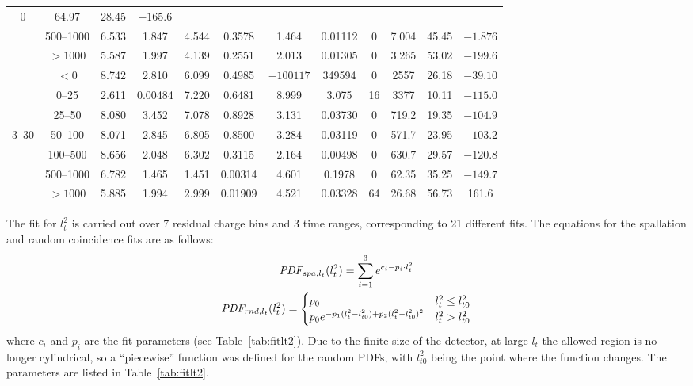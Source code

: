 \begin{table*}[hbt]
\begin{tabular}{cc|cccccc|cccc}
      0  & 64.97 & 28.45 &$-165.6$   \\
      & 500--1000& 6.533 & 1.847 & 4.544 & 0.3578  & 1.464 & 0.01112 &
      0  & 7.004 & 45.45 &  $-1.876$ \\
      & $>1000$ & 5.587 & 1.997 & 4.139 & 0.2551  & 2.013 & 0.01305 &
      0  & 3.265 & 53.02 &$-199.6$   \\
\hline
      & $<0$    & 8.742 & 2.810 & 6.099 & 0.4985  &$-100117$ & 349594  &
      0  & 2557  & 26.18 & $-39.10$  \\
      & 0--25    & 2.611 &0.00484& 7.220 & 0.6481  & 8.999 & 3.075   &
      16 & 3377  & 10.11 & $-115.0$   \\
      & 25--50   & 8.080 & 3.452 & 7.078 & 0.8928  & 3.131 & 0.03730 &
      0  & 719.2 & 19.35 &$-104.9$   \\
3--30  & 50--100  & 8.071 & 2.845 & 6.805 & 0.8500  & 3.284 & 0.03119 &
      0  & 571.7 & 23.95 &$-103.2$   \\
      & 100--500 & 8.656 & 2.048 & 6.302 & 0.3115  & 2.164 & 0.00498 &
      0  & 630.7 & 29.57 & $-120.8$   \\
      & 500--1000& 6.782 & 1.465 & 1.451 & 0.00314 & 4.601 & 0.1978  &
      0  & 62.35 & 35.25 & $-149.7$   \\
      & $>1000$ & 5.885 & 1.994 & 2.999 & 0.01909 & 4.521 & 0.03328 &
      64 & 26.68 & 56.73 & 161.6   \\
\bottomrule        %
\end{tabular}
\label{tab:fitlt2}
\end{table*}


The fit for $l_t^2$ is carried out over 7 residual charge bins and 3 time ranges, corresponding to 21 different fits. The equations for the spallation and random coincidence fits are as follows:
\begin{gather}
    \mbox{\it PDF}_{spa,l_t}(l_t^2) = \sum_{i=1}^3e^{c_i - p_i\cdot l_t^2}\\
    \mbox{\it PDF}_{rnd,l_t}(l_t^2) = 
    \begin{cases}
       p_0 & l_t^2 \leq l_{t0}^2 \\ 
       p_0e^{-p_1(l_t^2 - l_{t0}^2) + p_2(l_t^2-l_{t0}^2)^2}          & l_t^2 > l_{t0}^2 
    \end{cases}
\end{gather}
where $c_i$ and $p_i$ are the fit parameters (see Table~\ref{tab:fitlt2}). Due to the finite size of the detector, at large $l_t$ the allowed region is no longer cylindrical, so a ``piecewise'' function was defined for the random PDFs, with $l_{t0}^2$ being the point where the function changes. The parameters are listed in Table~\ref{tab:fitlt2}.

